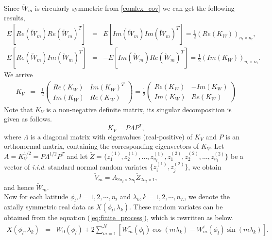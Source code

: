 Since $\utilde{W}_m$ is circularly-symmetric from \ref{comlex_cov} we can get the following results,
\begin{eqnarray*}		
E[Re(\utilde{W}_m)Re(\utilde{W}_m)^T] &=& E[Im(\utilde{W}_m)Im(\utilde{W}_m)^T] = \frac{1}{2}(Re(K_W))_{n_{l}\times n_{l}}, \\
E[Re(\utilde{W}_m)Im(\utilde{W}_m)^T] &=& -E[Im(\utilde{W}_m)Re(\utilde{W}_m)^T] = \frac{1}{2}(Im(K_W))_{n_{l}\times n_{l}}.
\end{eqnarray*}
We arrive			
	\begin{eqnarray*}
		K_V&=& \frac{1}{2}\left( \begin{array}{ll}
		Re(K_W) & Im(K_W)^T \\
		Im(K_W) & Re(K_W)
		\end{array}
		\right) = \frac{1}{2}\left( \begin{array}{ll}
		Re(K_W) & -Im(K_W) \\
		Im(K_W) & Re(K_W)
		\end{array}
		\right)
	\end{eqnarray*}
Note that $K_V$ is a non-negative definite matrix, its singular decomposition is given as follows.
	\[ K_V = P\Lambda P^T, \]
	where $\Lambda$ is a diagonal matrix with eigenvalues (real-positive) of $K_V$ and $P$ is an orthonormal matrix, containing the corresponding eigenvectors of $K_V$. Let $A = K_V^{1/2} = P\Lambda^{1/2} P^T$ and let $\utilde{Z} =\{z_1^{(1)}, z_2^{(1)}, \ldots, z_{n_l}^{(1)}, z_1^{(2)}, z_2^{(2)}, \ldots, z_{n_l}^{(2)}\}$ be a vector of {\em i.i.d.} standard normal random variates $\{z_i^{(1)}, z_j^{(2)}\}$, we obtain 
	\[\utilde{V}_m=A_{2n_{l}\times 2n_{l}}\utilde{Z}_{2n_{l}\times 1},\]
and hence $\utilde{W}_m$. \\

Now for each latitude $\phi_l, l = 1, 2, \cdots, n_l$ and $\lambda_k, k = 1, 2, \cdots, n_L$, we denote the axially symmetric real data as $X(\phi_l, \lambda_k)$. These random variates can be obtained from the equation (\ref{eq:finite_process}), which is rewritten as below.
	\begin{eqnarray} \label{eq:finite_process_2}
		X(\phi_l,\lambda_k) &=& W_0(\phi_l) + 2 \sum_{m =1}^N \left[W_m^r(\phi_l)\cos(m\lambda_k) - W_m^i(\phi_l)\sin(m \lambda_k)\right].
	\end{eqnarray}
		
	

